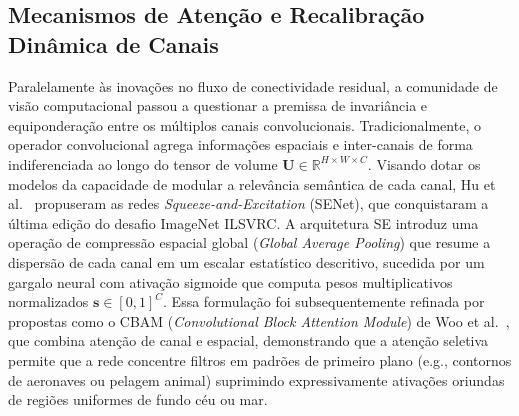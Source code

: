\documentclass[runningheads]{llncs}
\begin{document}
\subsection{Mecanismos de Aten\c{c}\~{a}o e Recalibra\c{c}\~{a}o Din\^{a}mica de Canais}
Paralelamente \`{a}s inova\c{c}\~{o}es no fluxo de conectividade residual, a comunidade de vis\~{a}o computacional passou a questionar a premissa de invari\^{a}ncia e equipondera\c{c}\~{a}o entre os m\'{u}ltiplos canais convolucionais. Tradicionalmente, o operador convolucional agrega informa\c{c}\~{o}es espaciais e inter-canais de forma indiferenciada ao longo do tensor de volume $\mathbf{U} \in \mathbb{R}^{H \times W \times C}$. Visando dotar os modelos da capacidade de modular a relev\^{a}ncia sem\^{a}ntica de cada canal, Hu et al.~\cite{hu2018squeeze} propuseram as redes \textit{Squeeze-and-Excitation} (SENet), que conquistaram a \'{u}ltima edi\c{c}\~{a}o do desafio ImageNet ILSVRC. A arquitetura SE introduz uma opera\c{c}\~{a}o de compress\~{a}o espacial global (\textit{Global Average Pooling}) que resume a dispers\~{a}o de cada canal em um escalar estat\'{i}stico descritivo, sucedida por um gargalo neural com ativa\c{c}\~{a}o sigmoide que computa pesos multiplicativos normalizados $\mathbf{s} \in [0, 1]^C$. Essa formula\c{c}\~{a}o foi subsequentemente refinada por propostas como o CBAM (\textit{Convolutional Block Attention Module}) de Woo et al.~\cite{woo2018cbam}, que combina aten\c{c}\~{a}o de canal e espacial, demonstrando que a aten\c{c}\~{a}o seletiva permite que a rede concentre filtros em padr\~{o}es de primeiro plano (e.g., contornos de aeronaves ou pelagem animal) suprimindo expressivamente ativa\c{c}\~{o}es oriundas de regi\~{o}es uniformes de fundo c\'{e}u ou mar.
\end{document}
